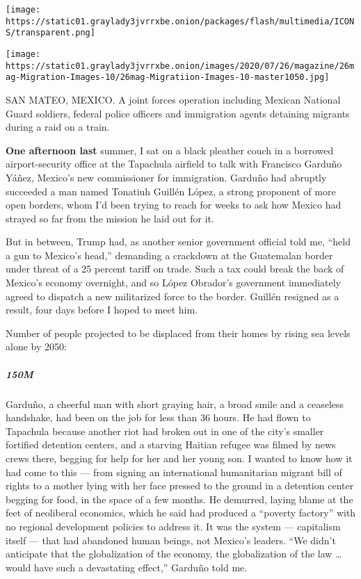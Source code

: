 \texttt{[image: https://static01.graylady3jvrrxbe.onion/packages/flash/multimedia/ICONS/transparent.png]}

\texttt{[image: https://static01.graylady3jvrrxbe.onion/images/2020/07/26/magazine/26mag-Migration-Images-10/26mag-Migratiion-Images-10-master1050.jpg]}

SAN MATEO, MEXICO. A joint forces operation including Mexican National
Guard soldiers, federal police officers and immigration agents detaining
migrants during a raid on a train.

\textbf{One afternoon last} summer, I sat on a black pleather couch in a
borrowed airport-security office at the Tapachula airfield to talk with
Francisco Garduño Yáñez, Mexico's new commissioner for immigration.
Garduño had abruptly succeeded a man named Tonatiuh Guillén López, a
strong proponent of more open borders, whom I'd been trying to reach for
weeks to ask how Mexico had strayed so far from the mission he laid out
for it.

But in between, Trump had, as another senior government official told
me, ``held a gun to Mexico's head,'' demanding a crackdown at the
Guatemalan border under threat of a 25 percent tariff on trade. Such a
tax could break the back of Mexico's economy overnight, and so López
Obrador's government immediately agreed to dispatch a new militarized
force to the border. Guillén resigned as a result, four days before I
hoped to meet him.

Number of people projected to be displaced from their homes by rising
sea levels alone by 2050:

\hypertarget{150m}{%
\subparagraph{150M}\label{150m}}

Garduño, a cheerful man with short graying hair, a broad smile and a
ceaseless handshake, had been on the job for less than 36 hours. He had
flown to Tapachula because another riot had broken out in one of the
city's smaller fortified detention centers, and a starving Haitian
refugee was filmed by news crews there, begging for help for her and her
young son. I wanted to know how it had come to this --- from signing an
international humanitarian migrant bill of rights to a mother lying with
her face pressed to the ground in a detention center begging for food,
in the space of a few months. He demurred, laying blame at the feet of
neoliberal economics, which he said had produced a ``poverty factory''
with no regional development policies to address it. It was the system
--- capitalism itself --- that had abandoned human beings, not Mexico's
leaders. ``We didn't anticipate that the globalization of the economy,
the globalization of the law \ldots{} would have such a devastating
effect,'' Garduño told me.

